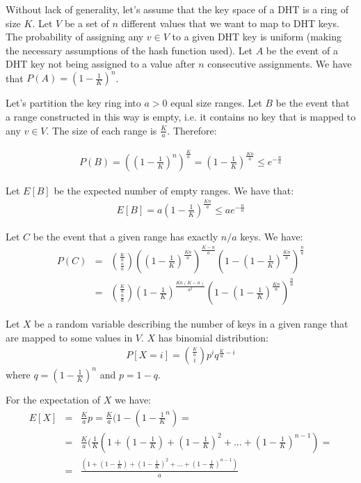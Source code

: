 \documentclass{article}
\begin{document}
Without lack of generality, let's assume that the key space of a DHT
is a ring of size $K$. Let $V$ be a set of $n$ different values that
we want to map to DHT keys. The probability of assigning any $v \in
V$ to a given DHT key is uniform (making the necessary assumptions of
the hash function used). Let $A$ be the event of a DHT key not being
assigned to a value after $n$ consecutive assignments. We have that
$P(A) = (1- \frac{1}{K})^n$.

Let's partition the key ring into $a > 0$ equal size ranges. Let
$B$ be the event that a range constructed in this way is empty,
i.e. it contains no key that is mapped to any $v \in V$. The size of
each range is $\frac{K}{a}$. Therefore:

\begin{eqnarray*}
P(B) = ((1-\frac{1}{K})^n)^{\frac{K}{a}} =
(1-\frac{1}{K})^\frac{Kn}{a} \leq e^{-\frac{n}{a}}
\end{eqnarray*}

Let $E[B]$ be the expected number of empty ranges. We have that:
\begin{eqnarray*}
E[B] = a(1-\frac{1}{K})^\frac{Kn}{a} \leq ae^{-\frac{n}{a}}
\end{eqnarray*}   

Let $C$ be the event that a given range has exactly $n/a$ keys. We
have:
\begin{eqnarray*}
P(C) &=& {{\frac{K}{a}} \choose
  {\frac{n}{a}}}
  ((1-\frac{1}{K})^\frac{Kn}{a})^\frac{K-n}{a}(1-(1-\frac{1}{K})^\frac{Kn}{a})^\frac{n}{a}\\
&=&  {{\frac{K}{a}} \choose
  {\frac{n}{a}}}(1-\frac{1}{K})^\frac{Kn(K-n)}{a^2}(1-(1-\frac{1}{K})^\frac{Kn}{a})^\frac{n}{a}
\end{eqnarray*}


Let $X$ be a random variable describing the number of keys in a given
range that are mapped to some values in $V$. $X$ has binomial
distribution:
\begin{eqnarray*}
P[X=i] = {\frac{K}{a} \choose i}p^iq^{\frac{K}{a}-i}
\end{eqnarray*}
where $q = (1-\frac{1}{K})^n$ and $p=1-q$.

For the expectation of $X$ we have:
\begin{eqnarray*}
E[X] &=& \frac{K}{a}p = \frac{K}{a}(1-(1-\frac{1}{K}^n) =\\
&=& \frac{K}{a}(\frac{1}{K}(1+(1-\frac{1}{K}) + (1-\frac{1}{K})^2 +
\ldots + (1-\frac{1}{K})^{n-1})=\\
&=& \frac{(1+(1-\frac{1}{K}) + (1-\frac{1}{K})^2 +
\ldots + (1-\frac{1}{K})^{n-1})}{a}
\end{eqnarray*}
\end{document}
